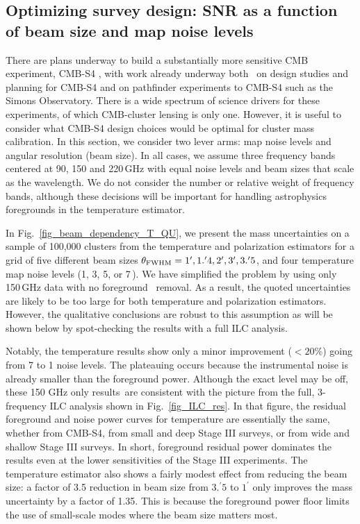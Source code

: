 \subsection{Optimizing survey design: SNR as a function of beam size and map noise levels}
\label{sec_beam_dependence}

There are plans underway to build a substantially more sensitive CMB experiment, CMB-S4 \citep{cmbs4-sb1}, with work already underway both \
on design studies and planning for CMB-S4 and on pathfinder experiments to CMB-S4 such as the Simons Observatory. There is a wide spectrum of science drivers for these experiments, of which CMB-cluster lensing is only one. However, it is useful to consider what CMB-S4 design choices would be optimal for cluster mass calibration. In this section, we consider two lever arms: map noise levels and angular resolution (beam size). In all cases, we assume three frequency bands centered at 90, 150 and 220\,GHz with equal noise levels and beam sizes that scale as the wavelength.                                                                                                                            
We do not consider the number or relative weight of frequency bands, although these decisions will be important for handling astrophysics foregrounds in the temperature estimator.

In Fig.~\ref{fig_beam_dependency_T_QU}, we present the mass uncertainties on a sample of 100,000 clusters from the temperature and polarization estimators for a grid of five different beam sizes $\theta_{{\rm FWHM}} = 1^\prime, 1.^\prime4, 2^\prime, 3^\prime, 3.^\prime 5$, and four temperature map noise levels (1, 3, 5, or 7\,\ukarcmin{}). We have simplified the problem by using only 150\,GHz data with no foreground \
removal. As a result, the quoted uncertainties are likely to be too large for both temperature and polarization estimators.
However, the qualitative conclusions are robust to this assumption as will be shown below by spot-checking the results with a full ILC analysis.

Notably, the temperature results show only a minor improvement ($<20$\%) going from 7 to 1 \ukarcmin{} noise levels. The plateauing occurs because the instrumental noise is already smaller than the foreground power. Although the exact level may be off, these 150 GHz only results\
 are consistent with the picture from the full, 3-frequency ILC analysis shown in Fig.~\ref{fig_ILC_res}. In that figure, the residual foreground and noise power curves for temperature are essentially the same, whether from CMB-S4, from small and deep Stage III surveys, or from wide and shallow Stage III surveys. In short, foreground residual power dominates the results even at the lower sensitivities of the Stage III experiments.
The temperature estimator also shows a fairly modest effect from reducing the beam size: a factor of 3.5 reduction in beam size from $3.^\prime5$ to $1^\prime$ only improves the mass uncertainty by a factor of 1.35. This is because the foreground power floor limits the use of small-scale modes where the beam size matters most.

